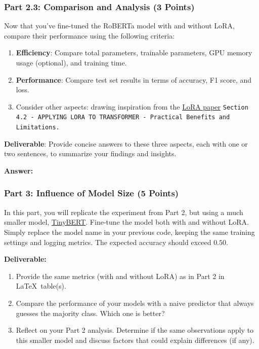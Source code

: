 \documentclass[11pt, oneside]{article}   	%
\begin{document}
\subsubsection*{Part 2.3: Comparison and Analysis (3 Points)}

Now that you've fine-tuned the RoBERTa model with and without LoRA, compare their performance using the following criteria:
\begin{enumerate}
    \item \textbf{Efficiency}: Compare total parameters, trainable parameters, GPU memory usage (optional), and training time.
    \item \textbf{Performance}: Compare test set results in terms of accuracy, F1 score, and loss.
    \item Consider other aspects: drawing inspiration from the \href{https://arxiv.org/abs/2106.09685}{LoRA paper} \texttt{Section 4.2 - APPLYING LORA TO TRANSFORMER - Practical Benefits and Limitations.}
\end{enumerate}
\textbf{Deliverable}: Provide concise answers to these three aspects, each with one or two sentences, to summarize your findings and insights.

\textbf{Answer:} \\


\subsubsection*{Part 3: Influence of Model Size (5 Points)}
In this part, you will replicate the experiment from Part 2, but using a much smaller model, \href{https://huggingface.co/huawei-noah/TinyBERT_General_4L_312D}{TinyBERT}. 
Fine-tune the model both with and without LoRA. Simply replace the model name in your previous code, keeping the same training settings and logging metrics. The expected accuracy should exceed $0.50$.

\textbf{Deliverable:}
\begin{enumerate}
    \item Provide the same metrics (with and without LoRA) as in Part 2 in \LaTeX~table(s).
    \item Compare the performance of your models with a naive predictor that always guesses the majority class. Which one is better?
    \item Reflect on your Part 2 analysis. Determine if the same observations apply to this smaller model and discuss factors that could explain differences (if any).
\end{enumerate}
\end{document}
